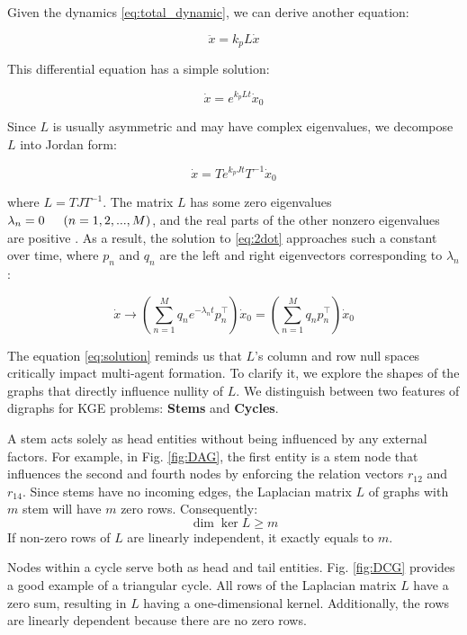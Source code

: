\documentclass[letterpaper, 10 pt, conference]{ieeeconf}  %
\begin{document}
Given the dynamics \eqref{eq:total_dynamic}, we can derive another equation:

\begin{equation}
    \ddot{x} = k_p L \dot{x}
    \label{eq:2dot}
\end{equation}

\noindent This differential equation has a simple solution:

\[
    \dot{x} = e^{k_p Lt} \dot{x}_0
\]

\noindent Since \( L \) is usually asymmetric and may have complex eigenvalues, we decompose \( L \) into Jordan form:

\[
    \dot{x} = Te^{k_p Jt}T^{-1} \dot{x}_0
\]

\noindent where \( L = TJT^{-1} \). The matrix \( L \) has some zero eigenvalues \( \lambda_n = 0 \indent (n = 1,2,...,M) \), and the real parts of the other nonzero eigenvalues are positive \cite{mirzaev_laplacian_2013}. As a result, the solution to \eqref{eq:2dot} approaches such a constant over time, where \( p_n \) and \( q_n \) are the left and right eigenvectors corresponding to \( \lambda_n \):

\begin{equation}
    \dot{x} \rightarrow (\sum_{n=1}^M q_n e^{-\lambda_n t}p_n^\top) \dot{x}_0 = (\sum_{n=1}^M q_n p_n^\top )\dot{x}_0
    \label{eq:solution}
\end{equation}

\noindent The equation \eqref{eq:solution} reminds us that $L$'s column and row null spaces critically impact multi-agent formation. 
To clarify it, we explore the shapes of the graphs that directly influence nullity of \( L\). We distinguish between two features of digraphs for KGE problems: \textbf{Stems} and \textbf{Cycles}.

A stem acts solely as head entities without being influenced by any external factors. For example, in Fig. \ref{fig:DAG}, the first entity is a stem node that influences the second and fourth nodes by enforcing the relation vectors \( r_{12} \) and \( r_{14} \). Since stems have no incoming edges, the Laplacian matrix \( L \) of graphs with \( m \) stem will have \( m \) zero rows. Consequently:
\[
    \dim \ker L \geq m
\]
If non-zero rows of $L$ are linearly independent, it exactly equals to $m$. 

Nodes within a cycle serve both as head and tail entities. Fig. \ref{fig:DCG} provides a good example of a triangular cycle. All rows of the Laplacian matrix \( L \) have a zero sum, resulting in \( L \) having a one-dimensional kernel. Additionally, the rows are linearly dependent because there are no zero rows.
\end{document}
